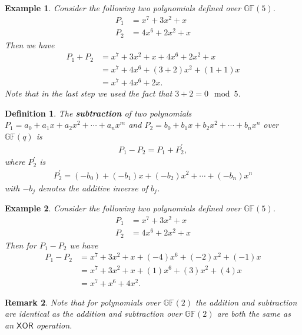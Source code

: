 \documentclass[12pt]{article}
\newtheorem{example}{Example}
\newtheorem{definition}{Definition}
\newtheorem{remark}[definition]{Remark}
\newcommand{\gf}[1]{\mathds{GF}\left(#1\right)} %
\begin{document}
\begin{example}
	Consider the following two polynomials defined over $\gf{5}$. 
	\begin{align*}
		P_1 &= x^7 + 3 x^2 + x \\
		P_2 &= 4 x^6 + 2 x^2 + x
	\end{align*}
	Then we have 
	\begin{align*}
		P_1 + P_2 &=  x^7 + 3 x^2 + x + 4 x^6 + 2 x^2 + x \\
		& = x^7 + 4 x^6 + (3+2) x^2 + (1 + 1) x   \\
		& = x^7 + 4 x^6 + 2x  .
	\end{align*}
	Note that in the last step we used the fact that $3+2 = 0 \mod 5$. 
\end{example}
 
 \begin{definition}
 	The \textbf{subtraction} of two polynomials $P_1 = a_0 + a_1 x + a_2 x^2 + \cdots + a_n x^m$ and $P_2 = b_0 + b_1 x + b_2 x^2 + \cdots + b_n x^n$ over $\gf{q}$ is 
 	\begin{align*}
 		P_1 - P_2  = P_1 + P^{\prime}_2 ,
 	\end{align*}
 	where $P^{\prime}_2$ is 
 	\begin{align*}
 		P^{\prime}_2 = (-b_0) + (-b_1) x + (-b_2) x^2 + \cdots + (-b_n) x^n
 	\end{align*} with $-b_j$ denotes the additive inverse of $b_j$.
 \end{definition}

\begin{example}
	Consider the following two polynomials defined over $\gf{5}$. 
	\begin{align*}
	P_1 &= x^7 + 3 x^2 + x \\
	P_2 &= 4 x^6 + 2 x^2 + x
	\end{align*}
	Then for $P_1 - P_2$ we have 
	\begin{align*}
	P_1 - P_2 &=  x^7 + 3 x^2 + x + (-4) x^6 + (-2) x^2 + (-1) x \\
	& = x^7 + 3 x^2 + x + (1) x^6 + (3) x^2 + (4) x \\
	& = x^7 + x^6 + 4 x^2 .
	\end{align*}
\end{example}


\begin{remark}
	Note that for polynomials over $\gf{2}$ the addition and subtraction are identical as the addition and subtraction over $\gf{2}$ are both the same as an $\mathsf{XOR}$ operation. 
\end{remark}
\end{document}
